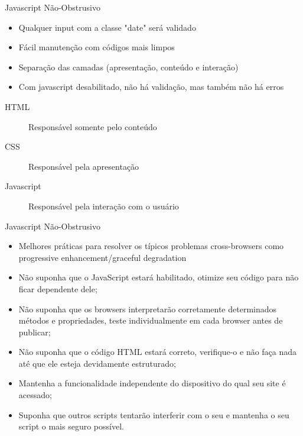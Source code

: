 \begin{frame}{Javascript Não-Obstrusivo}
\begin{itemize}
	\item Qualquer input com a classe "date" será validado
	\item Fácil manutenção com códigos mais limpos
	\item Separação das camadas (apresentação, conteúdo e interação)
	\item Com javascript desabilitado, não há validação, mas também não há erros
\end{itemize}
\begin{description}
	\item[HTML] Responsável somente pelo conteúdo
	\item[CSS] Responsável pela apresentação
	\item[Javascript] Responsável pela interação com o usuário
\end{description}
\end{frame}

\begin{frame}{Javascript Não-Obstrusivo}
\begin{itemize}
	\item Melhores práticas para resolver os típicos problemas cross-browsers como progressive enhancement/graceful degradation
	\item Não suponha que o JavaScript estará habilitado, otimize seu código para não ficar dependente dele;
	\item Não suponha que os browsers interpretarão corretamente determinados métodos e propriedades, teste individualmente em cada browser antes de publicar;
	\item Não suponha que o código HTML estará correto, verifique-o e não faça nada até que ele esteja devidamente estruturado;
	\item Mantenha a funcionalidade independente do dispositivo do qual seu site é acessado;
	\item Suponha que outros scripts tentarão interferir com o seu e mantenha o seu script o mais seguro possível.
\end{itemize}
\end{frame}
